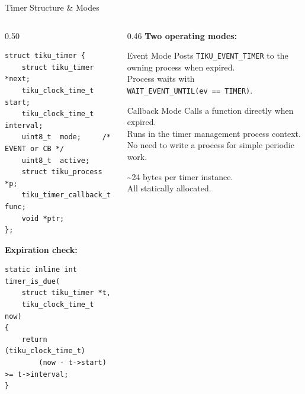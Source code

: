 \documentclass[aspectratio=169, 10pt]{beamer}
\begin{document}
\begin{frame}[fragile]{Timer Structure \& Modes}
\begin{columns}[T]
\begin{column}{0.50\textwidth}
\begin{lstlisting}[style=cstyle,
  title={kernel/timers/tiku\_timer.h}]
struct tiku_timer {
    struct tiku_timer *next;
    tiku_clock_time_t  start;
    tiku_clock_time_t  interval;
    uint8_t  mode;     /* EVENT or CB */
    uint8_t  active;
    struct tiku_process *p;
    tiku_timer_callback_t func;
    void *ptr;
};
\end{lstlisting}

\textbf{Expiration check:}
\begin{lstlisting}[style=cstyle]
static inline int timer_is_due(
    struct tiku_timer *t,
    tiku_clock_time_t now)
{
    return (tiku_clock_time_t)
        (now - t->start) >= t->interval;
}
\end{lstlisting}
\end{column}

\begin{column}{0.46\textwidth}
\textbf{Two operating modes:}

\vspace{0.3em}
\begin{block}{Event Mode}
Posts \texttt{TIKU\_EVENT\_TIMER} to the
owning process when expired.\\
Process waits with\\
\texttt{WAIT\_EVENT\_UNTIL(ev == TIMER)}.
\end{block}

\begin{block}{Callback Mode}
Calls a function directly when expired.\\
Runs in the timer management process context.\\
No need to write a process for simple periodic work.
\end{block}

\vspace{0.3em}
\textasciitilde24 bytes per timer instance.\\
All statically allocated.
\end{column}
\end{columns}
\end{frame}
\end{document}
